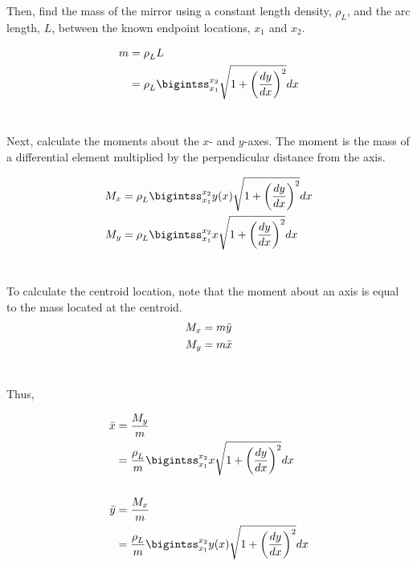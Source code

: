 Then, find the mass of the mirror using a constant length density, $\rho_L$, and the arc length, $L$, between the known endpoint locations, $x_1$ and $x_2$.

\begin{equation}
\label{eq:mass}
\centering
\begin{aligned}
	m &= \rho_L L \\
	&= \rho_L \bigintss_{x_1}^{x_2} \sqrt{1+\left(\frac{dy}{dx}\right)^2}dx
\end{aligned}
\end{equation}\

Next, calculate the moments about the $x$- and $y$-axes. The moment is the mass of a differential element multiplied by the perpendicular distance from the axis.

\begin{equation}
\label{eq:moment1}
\centering
\begin{aligned}
	M_x &= \rho_L \bigintss_{x_1}^{x_2} y(x)\sqrt{1+\left(\frac{dy}{dx}\right)^2}dx \\
	M_y &= \rho_L \bigintss_{x_1}^{x_2} x\sqrt{1+\left(\frac{dy}{dx}\right)^2}dx
\end{aligned}
\end{equation}\

To calculate the centroid location, note that the moment about an axis is equal to the mass located at the centroid.\\

\begin{equation}
\label{eq:moment2}
\centering
\begin{aligned}
	M_x &= m\bar{y} \\
	M_y &= m\bar{x}
\end{aligned}
\end{equation}\

Thus,

\begin{equation}
\label{eq:centroid}
\centering
\begin{aligned}
	\bar{x} &= \frac{M_y}{m} \\
	&= \frac{\rho_L}{m} \bigintss_{x_1}^{x_2} x\sqrt{1+\left(\frac{dy}{dx}\right)^2}dx \\
	\\
	\bar{y} &= \frac{M_x}{m} \\
	&= \frac{\rho_L}{m} \bigintss_{x_1}^{x_2} y(x)\sqrt{1+\left(\frac{dy}{dx}\right)^2}dx
\end{aligned}
\end{equation}\

